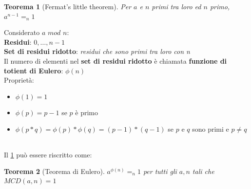 \documentclass[11pt, a4paper, twoside, italian]{report}
\theoremstyle{plain}
\newtheorem{thm}{Teorema}
\begin{document}
\begin{thm}[Fermat's little theorem]\label{thm:TeoremaFermat}
	Per $a$ e $n$ primi tra loro ed $n$ primo, ~~$a^{n-1} =_{n} 1 $
\end{thm}
\noindent
Considerato $a$ $mod$ $n$:\\
\textbf{Residui}: $0,\dots, n-1$ \\
\textbf{Set di residui ridotto}: \textit{residui che sono primi tra loro con n}\\
Il numero di elementi nel \textbf{set di residui ridotto} è chiamata \textbf{funzione di totient di Eulero}: $\phi(n)$\\
Proprietà:
\begin{itemize}
	\item $\phi(1)=1$
	\item $\phi(p) = p-1$ se $p$ è primo
	\item $\phi(p*q) = \phi(p)*\phi(q) = (p-1)*(q-1)$ se $p$ e $q$ sono primi e $p \neq q$
\end{itemize}
~\\
Il \cref{thm:TeoremaFermat} può essere riscritto come:
\begin{thm}[Teorema di Eulero]
	$a^{\phi(n)} =_{n} 1$ per tutti gli $a, n$ tali che $MCD(a,n) = 1$
\end{thm}
\end{document}
